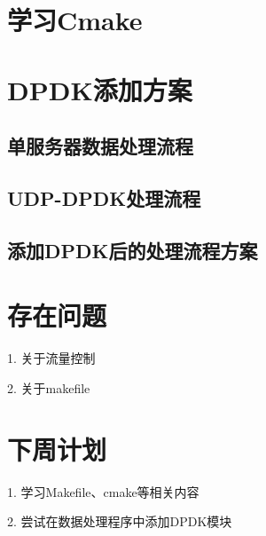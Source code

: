 \documentclass{article}
\begin{document}
\section{学习Cmake}

\section{DPDK添加方案}

\subsection{单服务器数据处理流程}

\subsection{UDP-DPDK处理流程}

\subsection{添加DPDK后的处理流程方案}

\section{存在问题}
1. 关于流量控制

2. 关于makefile

\section{下周计划}
1. 学习Makefile、cmake等相关内容

2. 尝试在数据处理程序中添加DPDK模块
\end{document}
